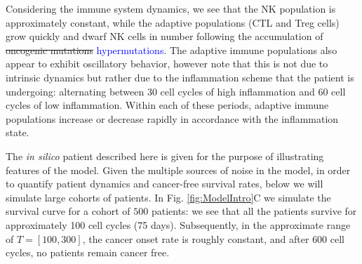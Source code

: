 \documentclass[11pt]{article}
\newcommand{\tcb} { \textcolor{blue} }
\begin{document}
\par 
Considering the immune system dynamics, we see that the NK population is approximately constant, while the adaptive populations (CTL and Treg cells) grow quickly and dwarf NK cells in number following the accumulation of \sout{oncogenic mutations} \tcb{hypermutations}.
The adaptive immune populations also appear to exhibit oscillatory behavior, however note that this is not due to intrinsic dynamics but rather due to the inflammation scheme that the patient is undergoing: alternating between 30 cell cycles of high inflammation and 60 cell cycles of low inflammation. Within each of these periods, adaptive immune populations increase or decrease rapidly in accordance with the inflammation state.
\par 
The {\em in silico} patient described here is given for the purpose of illustrating features of the model. Given the multiple sources of noise in the model, in order to quantify patient dynamics and cancer-free survival rates, below we will simulate large cohorts of patients. In Fig. \ref{fig:ModelIntro}C we simulate the survival curve for a cohort of $500$ patients: we see that all the patients survive for approximately 100 cell cycles (75 days). Subsequently, in the approximate range of $T= [100,300]$, the cancer onset rate is roughly constant, and after $600$ cell cycles, no patients remain cancer free.
\end{document}
